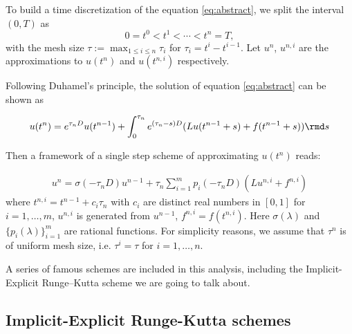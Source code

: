 To build a time discretization of the equation \eqref{eq:abstract},
we split the interval $(0, T)$ as
$$0 = t^0 < t^1 < \cdots < t^n = T,$$
with the mesh size $\tau := \max_{1\leq i \leq n}\tau_i$ for $\tau_i = t^i - t^{i-1}$.
Let $u^n$, $u^{n,i}$ are the approximations to $u(t^n)$ and $u(t^{n,i})$ respectively.

Following Duhamel's principle, the solution of equation \eqref{eq:abstract}
can be shown as

$$u(t^n) = e^{\tau_n D}u(t^{n-1}) + \int_0^{\tau_n}e^{(\tau_n-s)D}(Lu(t^{n-1}+s)+f(t^{n-1}+s))\rmd s$$

Then a framework of a single step scheme of approximating $u(t^n)$ reads:

\begin{align}\label{eq:SingleStep}
    u^n = \sigma(-\tau_n D)u^{n-1} + \tau_n \sum_{i=1}^mp_i(-\tau_n D)(L u^{n,i} + f^{n,i})
\end{align}
where $t^{n,i} = t^{n-1}  + c_i\tau_n$
with $c_i$ are distinct real numbers in $[0,1]$ for $i = 1, \dots, m$,
$u^{n,i}$ is generated from $u^{n-1}$, $f^{n,i} = f(t^{n,i})$. 
Here $\sigma(\lambda)$ and $\{p_i(\lambda)\}_{i=1}^m$ are rational functions.
For simplicity reasons, we assume that $\tau^n$ is of uniform mesh size, i.e. $\tau^i = \tau$ for $i = 1, \dots, n$.

A series of famous schemes are included in this analysis, including the Implicit-Explicit Runge--Kutta scheme
we are going to talk about.

\subsection{Implicit-Explicit Runge-Kutta schemes}

